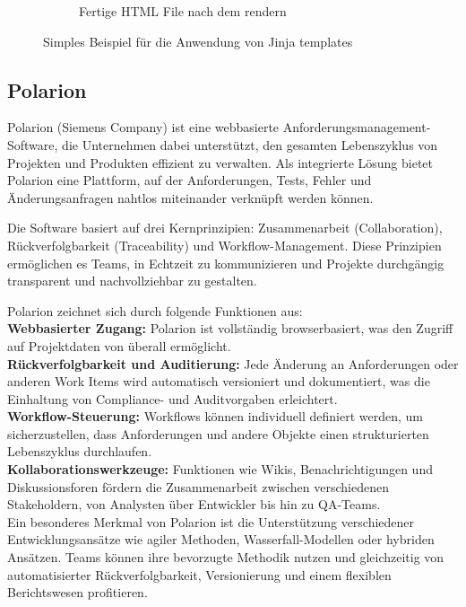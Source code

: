 \documentclass[a4paper, 12pt]{article}
\begin{document}
\begin{figure}[H]
\begin{subfigure}{0.6\textwidth}
        \caption{Fertige HTML File nach dem rendern}
        \label{fig:jinja_fertige_html_file}
    \end{subfigure}

    \caption{Simples Beispiel für die Anwendung von Jinja templates}
    \label{fig:jinja_example}
\end{figure}

\subsection{Polarion}\label{polarion}
Polarion (Siemens Company) ist eine webbasierte Anforderungsmanagement-Software, die Unternehmen dabei unterstützt, den gesamten Lebenszyklus von Projekten und Produkten effizient zu verwalten. Als integrierte Lösung bietet Polarion eine Plattform, auf der Anforderungen, Tests, Fehler und Änderungsanfragen nahtlos miteinander verknüpft werden können.

Die Software basiert auf drei Kernprinzipien: Zusammenarbeit (Collaboration), Rückverfolgbarkeit (Traceability) und Workflow-Management. Diese Prinzipien ermöglichen es Teams, in Echtzeit zu kommunizieren und Projekte durchgängig transparent und nachvollziehbar zu gestalten.

Polarion zeichnet sich durch folgende Funktionen aus:\\
\textbf{Webbasierter Zugang:} Polarion ist vollständig browserbasiert, was den Zugriff auf Projektdaten von überall ermöglicht.\\
\textbf{Rückverfolgbarkeit und Auditierung:} Jede Änderung an Anforderungen oder anderen Work Items wird automatisch versioniert und dokumentiert, was die Einhaltung von Compliance- und Auditvorgaben erleichtert.\\
\textbf{Workflow-Steuerung:} Workflows können individuell definiert werden, um sicherzustellen, dass Anforderungen und andere Objekte einen strukturierten Lebenszyklus durchlaufen.\\
\textbf{Kollaborationswerkzeuge:} Funktionen wie Wikis, Benachrichtigungen und Diskussionsforen fördern die Zusammenarbeit zwischen verschiedenen Stakeholdern, von Analysten über Entwickler bis hin zu QA-Teams.\\
Ein besonderes Merkmal von Polarion ist die Unterstützung verschiedener Entwicklungsansätze wie agiler Methoden, Wasserfall-Modellen oder hybriden Ansätzen. Teams können ihre bevorzugte Methodik nutzen und gleichzeitig von automatisierter Rückverfolgbarkeit, Versionierung und einem flexiblen Berichtswesen profitieren.
\end{document}
